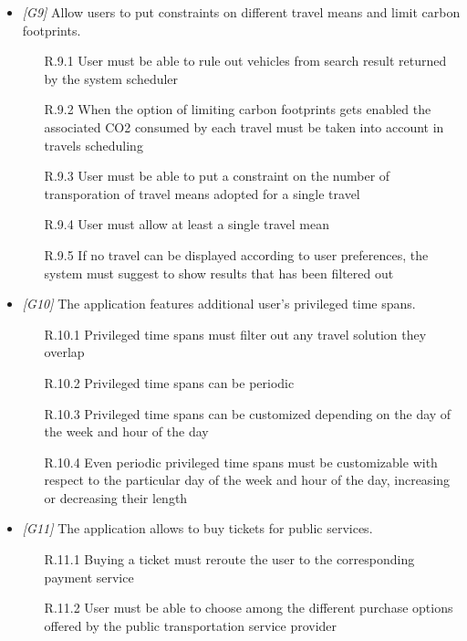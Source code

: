 \begin{itemize}
\item \textit{[G9]} Allow users to put constraints on different travel means and limit carbon footprints.

											\begin{itemize}
											
														\item[R.9.1] User must be able to rule out vehicles from search result returned by the system scheduler
														\item[R.9.2] When the option of limiting carbon footprints gets enabled the associated CO2 consumed by each travel must be taken into account in travels scheduling
														\item[R.9.3] User must be able to put a constraint on the number of transporation of travel means adopted for a single travel
														\item[R.9.4] User must allow at least a single travel mean 
														\item[R.9.5] If no travel can be displayed according to user preferences, the system must suggest to show results that has been filtered out
			
																						
											\end{itemize}



\item \textit{[G10]} The application features additional user’s privileged time spans.

											\begin{enumerate}
														\item[R.10.1] Privileged time spans must filter out any travel solution they overlap 
														\item[R.10.2] Privileged time spans can be periodic
														\item[R.10.3] Privileged time spans can be customized depending on the day of the week and hour of the day
														\item[R.10.4] Even periodic privileged time spans must be customizable with respect to the particular day of the week and hour of the day, increasing or decreasing their length
														
											\end{enumerate}

\item \textit{[G11]} The application allows to buy tickets for public services.

													\begin{enumerate}
														\item[R.11.1] Buying a ticket must reroute the user to the corresponding payment service
														\item[R.11.2] User must be able to choose among the different purchase options offered by the public transportation service provider
													\end{enumerate}


\end{itemize}
